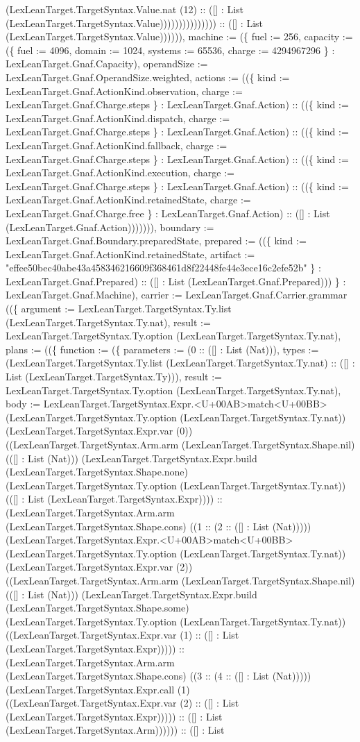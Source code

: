 \documentclass[11pt]{article}
\begin{document}
(LexLeanTarget.TargetSyntax.Value.nat (12) :: ([] : List (LexLeanTarget.TargetSyntax.Value))))))))))))))) :: ([] : List (LexLeanTarget.TargetSyntax.Value)))))), machine := (\{ fuel := 256, capacity := (\{ fuel := 4096, domain := 1024, systems := 65536, charge := 4294967296 \} : LexLeanTarget.Gnaf.Capacity), operandSize := LexLeanTarget.Gnaf.OperandSize.weighted, actions := ((\{ kind := LexLeanTarget.Gnaf.ActionKind.observation, charge := LexLeanTarget.Gnaf.Charge.steps \} : LexLeanTarget.Gnaf.Action) :: ((\{ kind := LexLeanTarget.Gnaf.ActionKind.dispatch, charge := LexLeanTarget.Gnaf.Charge.steps \} : LexLeanTarget.Gnaf.Action) :: ((\{ kind := LexLeanTarget.Gnaf.ActionKind.fallback, charge := LexLeanTarget.Gnaf.Charge.steps \} : LexLeanTarget.Gnaf.Action) :: ((\{ kind := LexLeanTarget.Gnaf.ActionKind.execution, charge := LexLeanTarget.Gnaf.Charge.steps \} : LexLeanTarget.Gnaf.Action) :: ((\{ kind := LexLeanTarget.Gnaf.ActionKind.retainedState, charge := LexLeanTarget.Gnaf.Charge.free \} : LexLeanTarget.Gnaf.Action) :: ([] : List (LexLeanTarget.Gnaf.Action))))))), boundary := LexLeanTarget.Gnaf.Boundary.preparedState, prepared := ((\{ kind := LexLeanTarget.Gnaf.ActionKind.retainedState, artifact := "effee50bec40abe43a458346216609f368461d8f22448fe44e3ece16c2efe52b" \} : LexLeanTarget.Gnaf.Prepared) :: ([] : List (LexLeanTarget.Gnaf.Prepared))) \} : LexLeanTarget.Gnaf.Machine), carrier := LexLeanTarget.Gnaf.Carrier.grammar ((\{ argument := LexLeanTarget.TargetSyntax.Ty.list (LexLeanTarget.TargetSyntax.Ty.nat), result := LexLeanTarget.TargetSyntax.Ty.option (LexLeanTarget.TargetSyntax.Ty.nat), plans := ((\{ function := (\{ parameters := (0 :: ([] : List (Nat))), types := (LexLeanTarget.TargetSyntax.Ty.list (LexLeanTarget.TargetSyntax.Ty.nat) :: ([] : List (LexLeanTarget.TargetSyntax.Ty))), result := LexLeanTarget.TargetSyntax.Ty.option (LexLeanTarget.TargetSyntax.Ty.nat), body := LexLeanTarget.TargetSyntax.Expr.<U+00AB>match<U+00BB> (LexLeanTarget.TargetSyntax.Ty.option (LexLeanTarget.TargetSyntax.Ty.nat)) (LexLeanTarget.TargetSyntax.Expr.var (0)) ((LexLeanTarget.TargetSyntax.Arm.arm (LexLeanTarget.TargetSyntax.Shape.nil) (([] : List (Nat))) (LexLeanTarget.TargetSyntax.Expr.build (LexLeanTarget.TargetSyntax.Shape.none) (LexLeanTarget.TargetSyntax.Ty.option (LexLeanTarget.TargetSyntax.Ty.nat)) (([] : List (LexLeanTarget.TargetSyntax.Expr)))) :: (LexLeanTarget.TargetSyntax.Arm.arm (LexLeanTarget.TargetSyntax.Shape.cons) ((1 :: (2 :: ([] : List (Nat))))) (LexLeanTarget.TargetSyntax.Expr.<U+00AB>match<U+00BB> (LexLeanTarget.TargetSyntax.Ty.option (LexLeanTarget.TargetSyntax.Ty.nat)) (LexLeanTarget.TargetSyntax.Expr.var (2)) ((LexLeanTarget.TargetSyntax.Arm.arm (LexLeanTarget.TargetSyntax.Shape.nil) (([] : List (Nat))) (LexLeanTarget.TargetSyntax.Expr.build (LexLeanTarget.TargetSyntax.Shape.some) (LexLeanTarget.TargetSyntax.Ty.option (LexLeanTarget.TargetSyntax.Ty.nat)) ((LexLeanTarget.TargetSyntax.Expr.var (1) :: ([] : List (LexLeanTarget.TargetSyntax.Expr))))) :: (LexLeanTarget.TargetSyntax.Arm.arm (LexLeanTarget.TargetSyntax.Shape.cons) ((3 :: (4 :: ([] : List (Nat))))) (LexLeanTarget.TargetSyntax.Expr.call (1) ((LexLeanTarget.TargetSyntax.Expr.var (2) :: ([] : List (LexLeanTarget.TargetSyntax.Expr))))) :: ([] : List (LexLeanTarget.TargetSyntax.Arm)))))) :: ([] : List 
\end{document}

